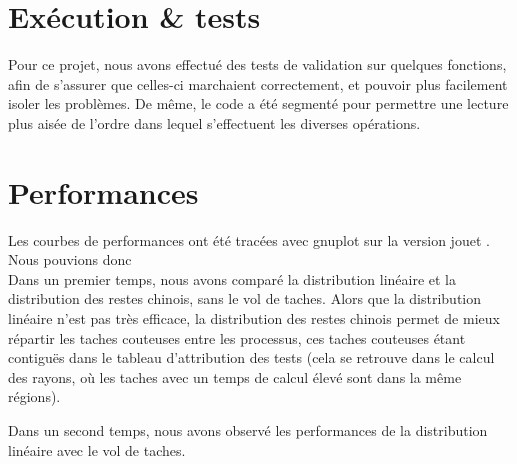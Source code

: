 \section{Exécution \& tests} %
\label{sec:execution}

Pour ce projet, nous avons effectué des tests de validation sur quelques fonctions, afin de s'assurer que celles-ci marchaient correctement, et pouvoir plus facilement isoler les problèmes. 
De même, le code a été segmenté pour permettre une lecture plus aisée de l'ordre dans lequel s'effectuent les diverses opérations.

\section{Performances} %
\label{sec:perf}

Les courbes de performances ont été tracées avec gnuplot sur la version \og jouet \fg. Nous pouvions donc\\

Dans un premier temps, nous avons comparé la distribution linéaire et la distribution des restes chinois, sans le vol de taches. Alors que la distribution linéaire n'est pas très efficace, la distribution des restes chinois permet de mieux répartir les taches couteuses entre les processus, ces taches couteuses étant contiguës dans le tableau d'attribution des tests (cela se retrouve dans le calcul des rayons, où les taches avec un temps de calcul élevé sont dans la même régions).

Dans un second temps, nous avons observé les performances de la distribution linéaire avec le vol de taches.


